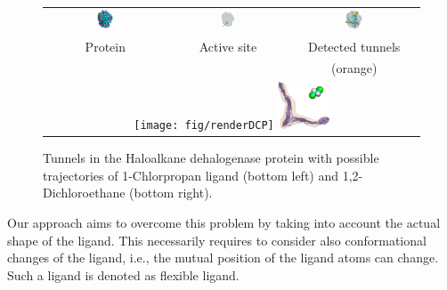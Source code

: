 \documentclass[usletter, 10pt, conference]{ieeeconf} %
\begin{document}
\begin{figure}[t]
\centering
{\footnotesize
\renewcommand{\arraystretch}{-0.5}
\renewcommand{\tabcolsep}{-1pt}
\begin{tabular}{ccc}
\includegraphics[width=0.14\textwidth]{fig/motiv1} &
\includegraphics[width=0.15\textwidth]{fig/motiv2lab} &
\includegraphics[width=0.14\textwidth]{fig/motiv3}  \\
Protein  & Active site & Detected tunnels \\ %
             &            & (orange)         \\  %
\multicolumn{3}{c}{%
\texttt{[image: fig/renderDCP]}  \hskip 15pt
\includegraphics[width=0.14\textwidth]{fig/render37t}} \\ 
\end{tabular}
}
\caption{\label{fig::motiv}
    \small
    Tunnels in the Haloalkane dehalogenase protein with possible trajectories of 1-Chlorpropan ligand (bottom left) and 1,2-Dichloroethane (bottom right).
}
\end{figure}

Our approach aims to overcome this problem by taking into account the actual shape of the ligand.
This necessarily requires to consider also conformational changes of the ligand, i.e., the mutual position of the ligand atoms can change.
Such a ligand is denoted as flexible ligand.
\end{document}
